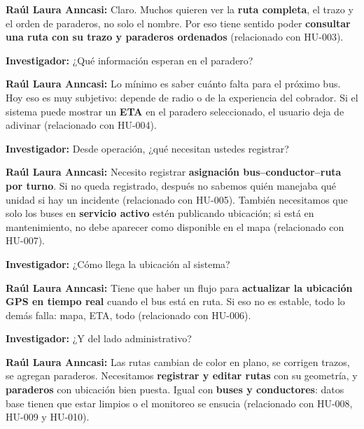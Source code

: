 \vspace{0.35em}
\noindent\textbf{Raúl Laura Anncasi:} Claro. Muchos quieren ver la \textbf{ruta completa}, el trazo y el orden de paraderos, no solo el nombre. Por eso tiene sentido poder \textbf{consultar una ruta con su trazo y paraderos ordenados} (relacionado con HU-003).

\vspace{0.35em}
\noindent\textbf{Investigador:} ¿Qué información esperan en el paradero?

\vspace{0.35em}
\noindent\textbf{Raúl Laura Anncasi:} Lo mínimo es saber cuánto falta para el próximo bus. Hoy eso es muy subjetivo: depende de radio o de la experiencia del cobrador. Si el sistema puede mostrar un \textbf{ETA} en el paradero seleccionado, el usuario deja de adivinar (relacionado con HU-004).

\vspace{0.35em}
\noindent\textbf{Investigador:} Desde operación, ¿qué necesitan ustedes registrar?

\vspace{0.35em}
\noindent\textbf{Raúl Laura Anncasi:} Necesito registrar \textbf{asignación bus--conductor--ruta por turno}. Si no queda registrado, después no sabemos quién manejaba qué unidad si hay un incidente (relacionado con HU-005). También necesitamos que solo los buses en \textbf{servicio activo} estén publicando ubicación; si está en mantenimiento, no debe aparecer como disponible en el mapa (relacionado con HU-007).

\vspace{0.35em}
\noindent\textbf{Investigador:} ¿Cómo llega la ubicación al sistema?

\vspace{0.35em}
\noindent\textbf{Raúl Laura Anncasi:} Tiene que haber un flujo para \textbf{actualizar la ubicación GPS en tiempo real} cuando el bus está en ruta. Si eso no es estable, todo lo demás falla: mapa, ETA, todo (relacionado con HU-006).

\vspace{0.35em}
\noindent\textbf{Investigador:} ¿Y del lado administrativo?

\vspace{0.35em}
\noindent\textbf{Raúl Laura Anncasi:} Las rutas cambian de color en plano, se corrigen trazos, se agregan paraderos. Necesitamos \textbf{registrar y editar rutas} con su geometría, y \textbf{paraderos} con ubicación bien puesta. Igual con \textbf{buses y conductores}: datos base tienen que estar limpios o el monitoreo se ensucia (relacionado con HU-008, HU-009 y HU-010).

